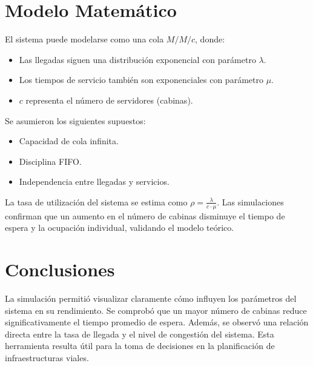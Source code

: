 \documentclass[12pt]{article}
\begin{document}
\section{Modelo Matemático}
El sistema puede modelarse como una cola $M/M/c$, donde:
\begin{itemize}
    \item Las llegadas siguen una distribución exponencial con parámetro $\lambda$.
    \item Los tiempos de servicio también son exponenciales con parámetro $\mu$.
    \item $c$ representa el número de servidores (cabinas).
\end{itemize}

Se asumieron los siguientes supuestos:
\begin{itemize}
    \item Capacidad de cola infinita.
    \item Disciplina FIFO.
    \item Independencia entre llegadas y servicios.
\end{itemize}

La tasa de utilización del sistema se estima como $\rho = \frac{\lambda}{c \cdot \mu}$. Las simulaciones confirman que un aumento en el número de cabinas disminuye el tiempo de espera y la ocupación individual, validando el modelo teórico.

\section{Conclusiones}
La simulación permitió visualizar claramente cómo influyen los parámetros del sistema en su rendimiento. Se comprobó que un mayor número de cabinas reduce significativamente el tiempo promedio de espera. Además, se observó una relación directa entre la tasa de llegada y el nivel de congestión del sistema. Esta herramienta resulta útil para la toma de decisiones en la planificación de infraestructuras viales.
\end{document}
